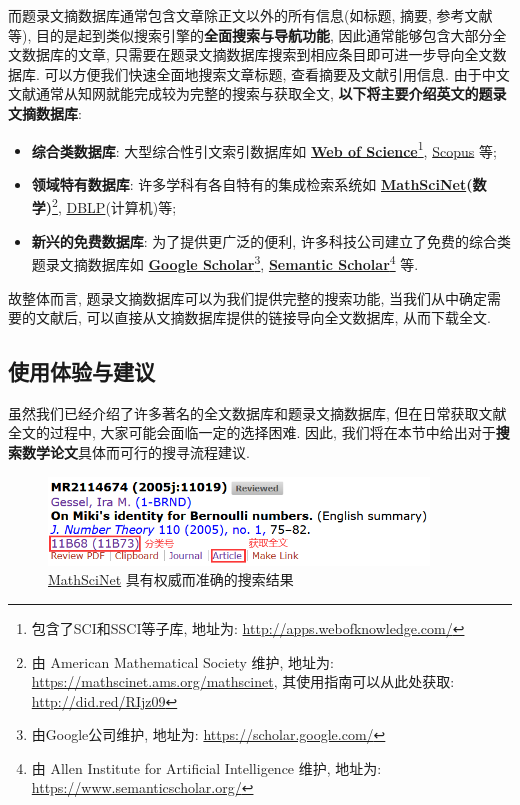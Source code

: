 \documentclass{formatBook}
\begin{document}
而题录文摘数据库通常包含文章除正文以外的所有信息(如标题, 摘要, 参考文献等), 目的是起到类似搜索引擎的\textbf{全面搜索与导航功能}, 因此通常能够包含大部分全文数据库的文章, 只需要在题录文摘数据库搜索到相应条目即可进一步导向全文数据库. 可以方便我们快速全面地搜索文章标题, 查看摘要及文献引用信息. 由于中文文献通常从知网就能完成较为完整的搜索与获取全文, \textbf{以下将主要介绍英文的题录文摘数据库}:
\begin{itemize}
    \item \textbf{综合类数据库}: 大型综合性引文索引数据库如 \textbf{\href{http://apps.webofknowledge.com/}{Web of Science}}\footnote{包含了SCI和SSCI等子库, 地址为: \url{http://apps.webofknowledge.com/}}, \href{https://www.scopus.com/}{Scopus} 等;
    \item \textbf{领域特有数据库}: 许多学科有各自特有的集成检索系统如 \textbf{\href{https://mathscinet.ams.org/mathscinet}{MathSciNet}(数学)}\footnote{由 American Mathematical Society 维护, 地址为: \url{https://mathscinet.ams.org/mathscinet}, 其使用指南可以从此处获取: \url{http://did.red/RIjz09}}, \href{https://dblp.uni-trier.de/}{DBLP}(计算机)等;
    \item \textbf{新兴的免费数据库}: 为了提供更广泛的便利, 许多科技公司建立了免费的综合类题录文摘数据库如 \textbf{\href{https://scholar.google.com/}{Google Scholar}}\footnote{由Google公司维护, 地址为: \url{https://scholar.google.com/}}, \textbf{\href{https://www.semanticscholar.org/}{Semantic Scholar}}\footnote{由 Allen Institute for Artificial Intelligence 维护, 地址为: \url{https://www.semanticscholar.org/}} 等.
\end{itemize}

故整体而言, 题录文摘数据库可以为我们提供完整的搜索功能, 当我们从中确定需要的文献后, 可以直接从文摘数据库提供的链接导向全文数据库, 从而下载全文.

\subsection{使用体验与建议}
虽然我们已经介绍了许多著名的全文数据库和题录文摘数据库, 但在日常获取文献全文的过程中, 大家可能会面临一定的选择困难. 因此, 我们将在本节中给出对于\textbf{搜索数学论文}具体而可行的搜寻流程建议.
\begin{figure}[htbp]
    \centering
    \includegraphics[width=0.9\textwidth]{figure/mathscinet.png}
    \caption{\href{https://mathscinet.ams.org/mathscinet}{MathSciNet} 具有权威而准确的搜索结果}
    \label{fig:mathscinet}
\end{figure}
\end{document}
